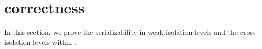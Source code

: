 \section{correctness}\label{sec:correctness}
In this section, we prove the serializability in weak isolation levels and the cross-isolation levels within \sysname. 




